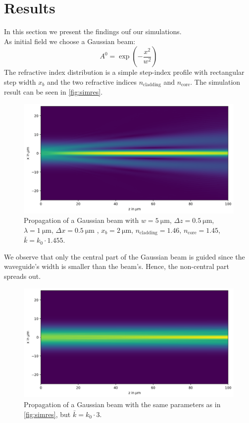 \documentclass[a4paper,12pt]{scrartcl}
\begin{document}
\section{Results}
    In this section we present the findings ouf our simulations.\\
    As initial field we choose a Gaussian beam:
    \begin{equation}
        A^0 = \exp\left(- \frac{x^2}{w^2} \right) 
    \end{equation}
    The refractive index distribution is a simple step-index profile with rectangular step width $x_b$ and the two refractive indices
    $n_\text{cladding}$ and $n_\text{core}$.
    The simulation result can be seen in \autoref{fig:simres}.
    \begin{figure}[H]
        \centering
        \includegraphics[width=.9\textwidth]{figures/index.png}
        \caption{Propagation of a Gaussian beam with $w=\SI{5}{\micro\meter}$, $\Delta z=\SI{0.5}{\micro\meter}$, $\lambda=\SI{1}{\micro\meter}$,  $\Delta x=\SI{0.5}{\micro\meter}$ , $x_b=\SI{2}{\micro\meter}$,
         $n_\text{cladding}=1.46$, $n_\text{core}=1.45$, $\bar k = k_0 \cdot 1.455$.}
        \label{fig:simres}
    \end{figure}
    We observe that only the central part of the Gaussian beam is guided since
    the waveguide's width is smaller than the beam's. Hence, the non-central part spreads out.
        \begin{figure}[H]
        \centering
        \includegraphics[width=.9\textwidth]{figures/index_kbar=3.png}
        \caption{Propagation of a Gaussian beam with the same parameters
        as in \autoref{fig:simres}, but $\bar k = k_0 \cdot 3$.}
        \label{fig:simres2}
    \end{figure}
\end{document}
